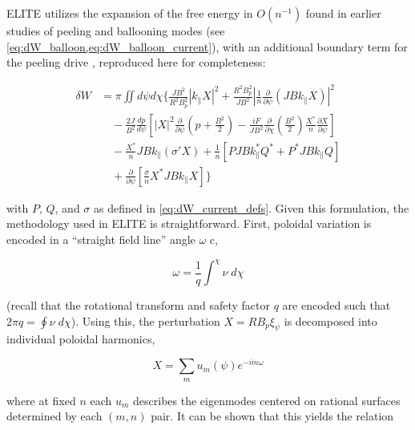 ELITE utilizes the expansion of the free energy in $O(n^{-1})$ found in earlier studies of peeling and ballooning modes (see \cref{eq:dW_balloon,eq:dW_balloon_current}), with an additional boundary term for the peeling drive \cite{Wilson2002,Dowsett2014}, reproduced here for completeness:

\begin{equation}\label{eq:dW_ELITE}
 \begin{aligned}
  \delta W &= \pi \iint d\psi d\chi \Bigg\{ \frac{JB^2}{R^2 B_p^2} \left| k_\parallel X \right|^2 + \frac{R^2 B_p^2}{JB^2} \left| \frac{1}{n} \frac{\partial}{\partial \psi} \left( JB k_\parallel X \right) \right|^2\\
  &\quad- \frac{2J}{B^2} \frac{dp}{d\psi} \left[ \left| X \right|^2 \frac{\partial}{\partial \psi} \left( p + \frac{B^2}{2} \right) - \frac{iF}{JB^2} \frac{\partial}{\partial \chi} \left( \frac{B^2}{2} \right) \frac{X^*}{n} \frac{\partial X}{\partial \psi} \right]\\
  &\quad-\frac{X^*}{n} JBk_\parallel \left( \sigma' X \right) + \frac{1}{n} \left[ PJBk_\parallel^* Q^* + P^* JBk_\parallel Q \right]\\
  &\quad+ \frac{\partial}{\partial \psi} \left[ \frac{\sigma}{n} X^* JBk_\parallel X \right] \Bigg\}
 \end{aligned}
\end{equation}

\noindent with $P$, $Q$, and $\sigma$ as defined in \cref{eq:dW_current_defs}.  Given this formulation, the methodology used in ELITE is straightforward.  First, poloidal variation is encoded in a ``straight field line'' angle $\omega$ c\cite{Wilson1999},

\begin{equation}\label{eq:ELITE_angle}
 \omega = \frac{1}{q} \int^\chi \nu \;d\chi
\end{equation}

\noindent (recall that the rotational transform and safety factor $q$ are encoded such that $2\pi q = \oint \nu \;d\chi$).  Using this, the perturbation $X = RB_p \xi_\psi$ is decomposed into individual poloidal harmonics,

\begin{equation}\label{eq:ELITE_x}
 X = \sum_m u_m(\psi) e^{-im\omega}
\end{equation}

\noindent where at fixed $n$ each $u_m$ describes the eigenmodes centered on rational surfaces determined by each $(m,n)$ pair.  It can be shown \cite{Wilson2002} that this yields the relation

